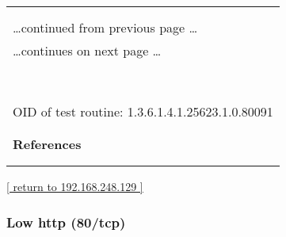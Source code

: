 \documentclass{article}
\begin{document}
\begin{longtable}{|p{}|}
\hline
\rowcolor{openvas_warning}{\color{white}{Medium (CVSS: 2.6) }}\\
\rowcolor{openvas_warning}{\color{white}{NVT: TCP timestamps}}\\
\hline
\endfirsthead
\hfill\ldots continued from previous page \ldots \\
\hline
\endhead
\hline
\ldots continues on next page \ldots \\
\endfoot
\hline
\endlastfoot
\\
\rowcolor{white}{\verb=It was detected that the host implements RFC1323.=}\\
\rowcolor{white}{\verb=The following timestamps were retrieved with a delay of 1 seconds in-between:=}\\
\rowcolor{white}{\verb=Paket 1: 1776245=}\\
\rowcolor{white}{\verb=Paket 2: 1776498=}\\
\rowcolor{white}{\verb==}\\
\rowcolor{white}{\verb==}\\
\\
OID of test routine: 1.3.6.1.4.1.25623.1.0.80091\\
\\

      \hline
      \\
\textbf{References}\\
\rowcolor{white}{\verb=Other:=}\\
\rowcolor{white}{\verb=  URL:http://www.ietf.org/rfc/rfc1323.txt=}\\
\end{longtable}

\begin{footnotesize}\hyperref[host:192.168.248.129]{[ return to 192.168.248.129 ]}\end{footnotesize}
\subsubsection{Low http (80/tcp)}
\label{port:192.168.248.129 http (80/tcp) Low}
\end{document}

